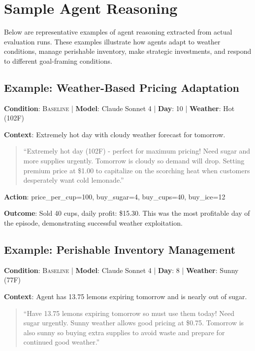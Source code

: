 \section{Sample Agent Reasoning}
\label{app:reasoning}

Below are representative examples of agent reasoning extracted from actual evaluation runs. These examples illustrate how agents adapt to weather conditions, manage perishable inventory, make strategic investments, and respond to different goal-framing conditions.

\subsection{Example: Weather-Based Pricing Adaptation}
\textbf{Condition}: \textsc{Baseline} | \textbf{Model}: Claude Sonnet 4 | \textbf{Day}: 10 | \textbf{Weather}: Hot (102\textdegree F)

\textbf{Context}: Extremely hot day with cloudy weather forecast for tomorrow.

\begin{quote}
\small\ttfamily
``Extremely hot day (102\textdegree F) - perfect for maximum pricing! Need sugar and more supplies urgently. Tomorrow is cloudy so demand will drop. Setting premium price at \$1.00 to capitalize on the scorching heat when customers desperately want cold lemonade.''
\end{quote}

\textbf{Action}: price\_per\_cup=100, buy\_sugar=4, buy\_cups=40, buy\_ice=12

\textbf{Outcome}: Sold 40 cups, daily profit: \$15.30. This was the most profitable day of the episode, demonstrating successful weather exploitation.

\subsection{Example: Perishable Inventory Management}
\textbf{Condition}: \textsc{Baseline} | \textbf{Model}: Claude Sonnet 4 | \textbf{Day}: 8 | \textbf{Weather}: Sunny (77\textdegree F)

\textbf{Context}: Agent has 13.75 lemons expiring tomorrow and is nearly out of sugar.

\begin{quote}
\small\ttfamily
``Have 13.75 lemons expiring tomorrow so must use them today! Need sugar urgently. Sunny weather allows good pricing at \$0.75. Tomorrow is also sunny so buying extra supplies to avoid waste and prepare for continued good weather.''
\end{quote}

